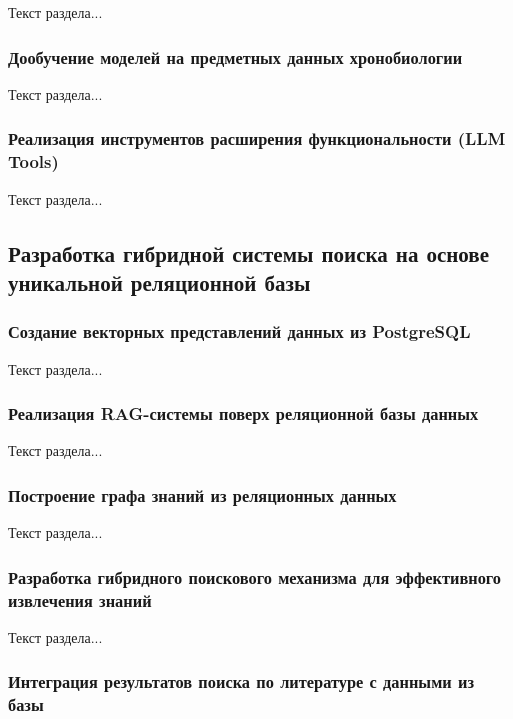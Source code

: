 Текст раздела...

\subsubsection{Дообучение моделей на предметных данных хронобиологии}

Текст раздела...

\subsubsection{Реализация инструментов расширения функциональности (LLM Tools)}

Текст раздела...

\subsection{Разработка гибридной системы поиска на основе уникальной реляционной базы}

\subsubsection{Создание векторных представлений данных из PostgreSQL}

Текст раздела...

\subsubsection{Реализация RAG-системы поверх реляционной базы данных}

Текст раздела...

\subsubsection{Построение графа знаний из реляционных данных}

Текст раздела...

\subsubsection{Разработка гибридного поискового механизма для эффективного извлечения знаний}

Текст раздела...

\subsubsection{Интеграция результатов поиска по литературе с данными из базы}

